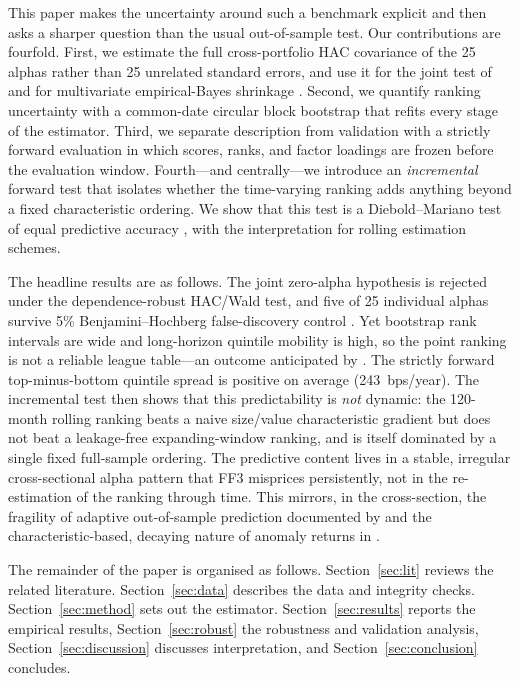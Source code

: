 \documentclass[11pt]{article}
\begin{document}
This paper makes the uncertainty around such a benchmark explicit and then
asks a sharper question than the usual out-of-sample test. Our contributions
are fourfold. First, we estimate the full cross-portfolio HAC covariance of
the 25 alphas \citep{NeweyWest1987} rather than 25 unrelated standard errors,
and use it for the joint test of \citet{GRS1989} and for multivariate
empirical-Bayes shrinkage \citep{EfronMorris1973}. Second, we quantify ranking
uncertainty with a common-date circular block bootstrap
\citep{Kunsch1989,PolitisRomano1994} that refits every stage of the estimator.
Third, we separate description from validation with a strictly forward
evaluation in which scores, ranks, and factor loadings are frozen before the
evaluation window. Fourth---and centrally---we introduce an \emph{incremental}
forward test that isolates whether the time-varying ranking adds anything
beyond a fixed characteristic ordering. We show that this test is a
Diebold--Mariano test of equal predictive accuracy \citep{DieboldMariano1995},
with the \citet{GiacominiWhite2006} interpretation for rolling estimation
schemes.

The headline results are as follows. The joint zero-alpha hypothesis is
rejected under the dependence-robust HAC/Wald test, and five of 25 individual
alphas survive 5\% Benjamini--Hochberg false-discovery control
\citep{BenjaminiHochberg1995}. Yet bootstrap rank intervals are wide and
long-horizon quintile mobility is high, so the point ranking is not a reliable
league table---an outcome anticipated by \citet{LewellenNagelShanken2010}. The
strictly forward top-minus-bottom quintile spread is positive on average
(243~bps/year). The incremental test then shows that this predictability is
\emph{not} dynamic: the 120-month rolling ranking beats a naive size/value
characteristic gradient but does not beat a leakage-free expanding-window
ranking, and is itself dominated by a single fixed full-sample ordering. The
predictive content lives in a stable, irregular cross-sectional alpha pattern
that FF3 misprices persistently, not in the re-estimation of the ranking
through time. This mirrors, in the cross-section, the fragility of adaptive
out-of-sample prediction documented by \citet{WelchGoyal2008} and the
characteristic-based, decaying nature of anomaly returns in
\citet{McLeanPontiff2016}.

The remainder of the paper is organised as follows. Section~\ref{sec:lit}
reviews the related literature. Section~\ref{sec:data} describes the data and
integrity checks. Section~\ref{sec:method} sets out the estimator.
Section~\ref{sec:results} reports the empirical results, Section~\ref{sec:robust}
the robustness and validation analysis, Section~\ref{sec:discussion} discusses
interpretation, and Section~\ref{sec:conclusion} concludes.
\end{document}
